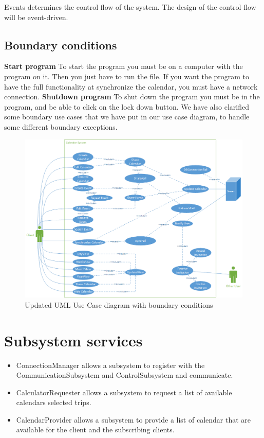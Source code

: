  Events determines the control flow of the system. The design of the control flow will be event-driven. 

\newpage
\section*{Boundary conditions}
\textbf{Start program}
To start the program you must be on a computer with the program on it. Then you just have to run the file. If you want the program to have the full functionality at synchronize the calendar, you must have a network connection. 
\newline
\newline
\textbf{Shutdown program}
To shut down the program you must be in the program, and be able to click on the lock down button. 
We have also clarified some boundary use cases that we have put in our use case diagram, to handle some different boundary exceptions. 


\begin{figure}[ht!]
\centering
\includegraphics[width=160mm]{usecase.png}
\caption{Updated UML Use Case diagram with  boundary conditions \label{overflow}}
\end{figure}


\newpage
\chapter*{Subsystem services}

\begin{itemize}
	\item ConnectionManager allows a subsystem to register with the CommunicationSubsystem and ControlSubsystem and communicate.
	\item CalculatorRequester allows a subsystem to request a list of available calendars selected trips.
	\item CalendarProvider allows a subsystem to provide a list of calendar that are available for the client and the subscribing clients. 
\end{itemize}

